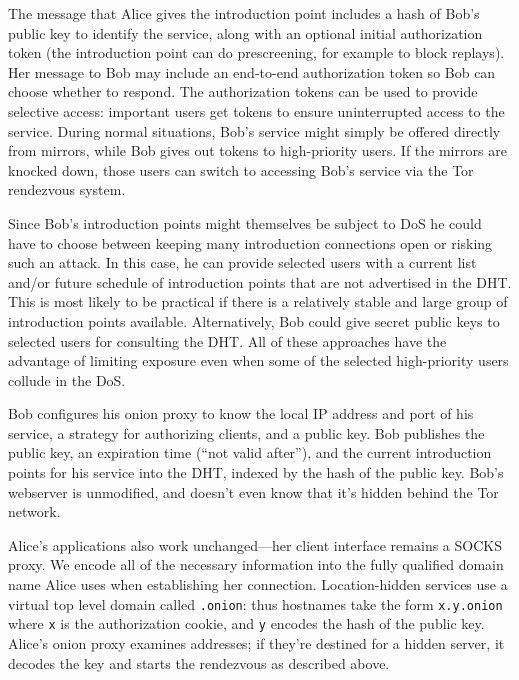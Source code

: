\documentclass[times,10pt,twocolumn]{article}
\begin{document}
The message that Alice gives
the introduction point includes a hash of Bob's public key to identify
the service, along with an optional initial authorization token (the
introduction point can do prescreening, for example to block replays). Her
message to Bob may include an end-to-end authorization token so Bob
can choose whether to respond.
The authorization tokens can be used to provide selective access:
important users get tokens to ensure uninterrupted access to the
service. During normal situations, Bob's service might simply be offered
directly from mirrors, while Bob gives out tokens to high-priority users. If
the mirrors are knocked down,
those users can switch to accessing Bob's service via
the Tor rendezvous system.

Since Bob's introduction points might themselves be subject to DoS he
could have to choose between keeping many
introduction connections open or risking such an attack. In this case,
he can provide selected users
with a current list and/or future schedule of introduction points that
are not advertised in the DHT\@. This is most likely to be practical
if there is a relatively stable and large group of introduction points
available. Alternatively, Bob could give secret public keys
to selected users for consulting the DHT\@. All of these approaches
have the advantage of limiting exposure even when
some of the selected high-priority users collude in the DoS\@.


Bob configures his onion proxy to know the local IP address and port of his
service, a strategy for authorizing clients, and a public key. Bob
publishes the public key, an expiration time (``not valid after''), and
the current introduction points for his service into the DHT, indexed
by the hash of the public key.  Bob's webserver is unmodified,
and doesn't even know that it's hidden behind the Tor network.

Alice's applications also work unchanged---her client interface
remains a SOCKS proxy. We encode all of the necessary information
into the fully qualified domain name Alice uses when establishing her
connection. Location-hidden services use a virtual top level domain
called {\tt .onion}: thus hostnames take the form {\tt x.y.onion} where
{\tt x} is the authorization cookie, and {\tt y} encodes the hash of
the public key. Alice's onion proxy
examines addresses; if they're destined for a hidden server, it decodes
the key and starts the rendezvous as described above.
\end{document}
